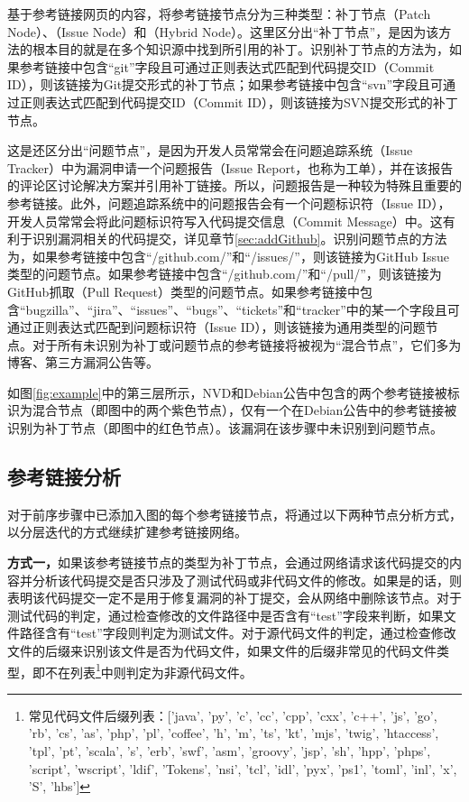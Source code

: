 基于参考链接网页的内容，\tool 将参考链接节点分为三种类型：补丁节点（Patch Node）、（Issue Node）和（Hybrid Node）。这里区分出“补丁节点”，是因为该方法的根本目的就是在多个知识源中找到所引用的补丁。识别补丁节点的方法为，如果参考链接中包含“git”字段且可通过正则表达式匹配到代码提交ID（Commit ID），则该链接为Git提交形式的补丁节点；如果参考链接中包含“svn”字段且可通过正则表达式匹配到代码提交ID（Commit ID），则该链接为SVN提交形式的补丁节点。

这是还区分出“问题节点”，是因为开发人员常常会在问题追踪系统（Issue Tracker）中为漏洞申请一个问题报告（Issue Report，也称为工单），并在该报告的评论区讨论解决方案并引用补丁链接。所以，问题报告是一种较为特殊且重要的参考链接。此外，问题追踪系统中的问题报告会有一个问题标识符（Issue ID），开发人员常常会将此问题标识符写入代码提交信息（Commit Message）中。这有利于识别漏洞相关的代码提交，详见章节\ref{sec:addGithub}。识别问题节点的方法为，如果参考链接中包含“/github.com/”和“/issues/”，则该链接为GitHub Issue类型的问题节点。如果参考链接中包含“/github.com/”和“/pull/”，则该链接为GitHub抓取（Pull Request）类型的问题节点。如果参考链接中包含“bugzilla”、“jira”、“issues”、“bugs”、“tickets”和“tracker”中的某一个字段且可通过正则表达式匹配到问题标识符（Issue ID），则该链接为通用类型的问题节点。对于所有未识别为补丁或问题节点的参考链接将被视为“混合节点”，它们多为博客、第三方漏洞公告等。


\begin{exmp}
如图\ref{fig:example}中的第三层所示，NVD和Debian公告中包含的两个参考链接被标识为混合节点（即图中的两个紫色节点），仅有一个在Debian公告中的参考链接被识别为补丁节点（即图中的红色节点）。该漏洞在该步骤中未识别到问题节点。
\end{exmp}

\subsection{参考链接分析}
对于前序步骤中已添加入图的每个参考链接节点，\tool 将通过以下两种节点分析方式，以分层迭代的方式继续扩建参考链接网络。%

\textbf{方式一，}如果该参考链接节点的类型为补丁节点，\tool 会通过网络请求该代码提交的内容并分析该代码提交是否只涉及了测试代码或非代码文件的修改。如果是的话，则表明该代码提交一定不是用于修复漏洞的补丁提交，\tool 会从网络中删除该节点。对于测试代码的判定，\tool 通过检查修改的文件路径中是否含有“test”字段来判断，如果文件路径含有“test”字段则判定为测试文件。对于源代码文件的判定，\tool 通过检查修改文件的后缀来识别该文件是否为代码文件，如果文件的后缀非常见的代码文件类型，即不在列表\footnote{常见代码文件后缀列表：['java', 'py', 'c', 'cc', 'cpp', 'cxx', 'c++', 'js', 'go', 'rb', 'cs', 'as', 'php', 'pl', 'coffee', 'h', 'm', 'ts', 'kt', 'mjs', 'twig', 'htaccess', 'tpl', 'pt', 'scala', 's', 'erb', 'swf', 'asm', 'groovy', 'jsp', 'sh', 'hpp', 'phps', 'script', 'wscript', 'ldif', 'Tokens', 'nsi', 'tcl', 'idl', 'pyx', 'ps1', 'toml', 'inl', 'x', 'S', 'hbs']}中则判定为非源代码文件。

